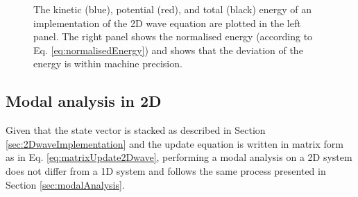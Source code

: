 \begin{figure}[h]
    \centering
      \caption{The kinetic (blue), potential (red), and total (black) energy of an implementation of the 2D wave equation are plotted in the left panel. The right panel shows the normalised energy (according to Eq. \eqref{eq:normalisedEnergy}) and shows that the deviation of the energy is within machine precision. \label{fig:energy2Dwave}}
\end{figure}

\subsection{Modal analysis in 2D}
Given that the state vector is stacked as described in Section \ref{sec:2DwaveImplementation} and the update equation is written in matrix form as in Eq. \eqref{eq:matrixUpdate2Dwave}, performing a modal analysis on a 2D system does not differ from a 1D system and follows the same process presented in Section \ref{sec:modalAnalysis}.

